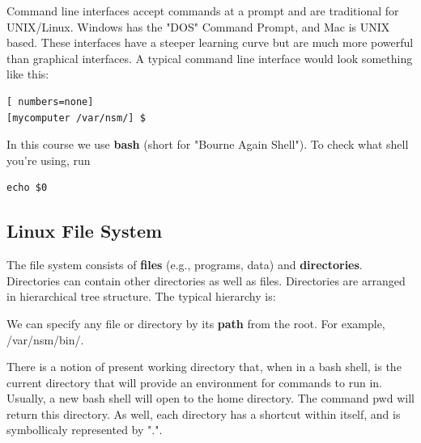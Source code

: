 \documentclass[english, 11pt]{article}
\begin{document}
  \begin{rem}
    Command line interfaces accept commands at a prompt and are traditional for UNIX/Linux. Windows has the "DOS" Command Prompt, and Mac is UNIX based. These interfaces have a steeper learning curve but are much more powerful than graphical interfaces. A typical command line interface would look something like this:
    \begin{lstlisting}[ numbers=none]
[mycomputer /var/nsm/] $
    \end{lstlisting}
  \end{rem}

  In this course we use \textbf{bash} (short for "Bourne Again Shell"). To check what shell you're using, run

  \begin{lstlisting}[numbers=none]
echo $0
  \end{lstlisting}

  \subsection{Linux File System}

  The file system consists of \textbf{files} (e.g., programs, data) and \textbf{directories}. Directories can contain other directories as well as files. Directories are arranged in hierarchical tree structure. The typical hierarchy is:

  \begin{center}
  \end{center}

  We can specify any file or directory by its \textbf{path} from the root. For example, {\ttfamily /var/nsm/bin/}.

  \begin{defn}
    There is a notion of present working directory that, when in a bash shell, is the current directory that will provide an environment for commands to run in. Usually, a new bash shell will open to the home directory. The command {\ttfamily pwd} will return this directory. As well, each directory has a shortcut within itself, and is symbollicaly represented by "{\ttfamily .}".
  \end{defn}
\end{document}
